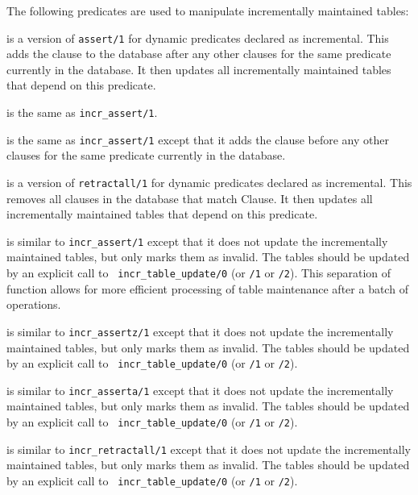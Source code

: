 The following predicates are used to manipulate incrementally
maintained tables:

\begin{description}
 is a
version of {\tt assert/1} for dynamic predicates declared as
incremental.  This adds the clause to the database after any other
clauses for the same predicate currently in the database.  It then
updates all incrementally maintained tables that depend on this
predicate.

is the same as {\tt incr\_assert/1}.

is the same as {\tt incr\_assert/1} except that it adds the clause
before any other clauses for the same predicate currently in the
database.

is a version of {\tt retractall/1} for dynamic predicates declared as
incremental.  This removes all clauses in the database that match
Clause.  It then updates all incrementally maintained tables that
depend on this predicate.

is similar to {\tt incr\_assert/1} except that it does not update the
incrementally maintained tables, but only marks them as invalid.  The
tables should be updated by an explicit call to {\tt
incr\_table\_update/0} (or {\tt /1} or {\tt /2}).  This separation of
function allows for more efficient processing of table maintenance
after a batch of operations.

is similar to {\tt incr\_assertz/1} except that it does not update the
incrementally maintained tables, but only marks them as invalid.  The
tables should be updated by an explicit call to {\tt
incr\_table\_update/0} (or {\tt /1} or {\tt /2}).

is similar to {\tt incr\_asserta/1} except that it does not update the
incrementally maintained tables, but only marks them as invalid.  The
tables should be updated by an explicit call to {\tt
incr\_table\_update/0} (or {\tt /1} or {\tt /2}).

is similar to {\tt incr\_retractall/1} except that it does not update
the incrementally maintained tables, but only marks them as invalid.
The tables should be updated by an explicit call to {\tt
incr\_table\_update/0} (or {\tt /1} or {\tt /2}).


\end{description}
